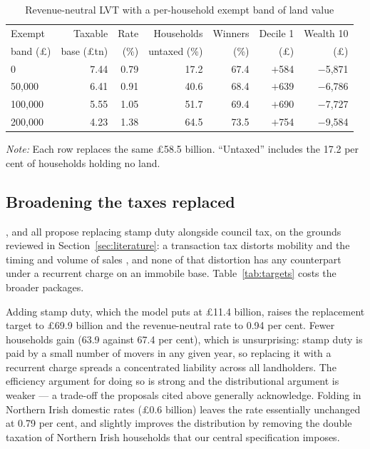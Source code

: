 \begin{table}[htbp]
\centering
\caption{Revenue-neutral LVT with a per-household exempt band of land value}
\label{tab:exempt}
\begin{tabular}{lrrrrrr}
\toprule
Exempt & Taxable & Rate & Households & Winners & Decile 1 & Wealth 10 \\
band (\pounds) & base (\pounds tn) & (\%) & untaxed (\%) & (\%) & (\pounds) & (\pounds) \\
\midrule
0         & 7.44 & 0.79 & 17.2 & 67.4 & $+$584 & $-$5{,}871 \\
50{,}000  & 6.41 & 0.91 & 40.6 & 68.4 & $+$639 & $-$6{,}786 \\
100{,}000 & 5.55 & 1.05 & 51.7 & 69.4 & $+$690 & $-$7{,}727 \\
200{,}000 & 4.23 & 1.38 & 64.5 & 73.5 & $+$754 & $-$9{,}584 \\
\bottomrule
\end{tabular}

\medskip
{\footnotesize\emph{Note:} Each row replaces the same \pounds 58.5 billion. ``Untaxed'' includes the 17.2 per cent of households holding no land.}
\end{table}

\subsection{Broadening the taxes replaced}
\label{sec:broader}

\citet{mirrlees2011}, \citet{muellbauer2005} and \citet{leunig2024} all propose replacing stamp duty alongside council tax, on the grounds reviewed in Section~\ref{sec:literature}: a transaction tax distorts mobility and the timing and volume of sales \citep{best2018, hilber2017}, and none of that distortion has any counterpart under a recurrent charge on an immobile base. Table~\ref{tab:targets} costs the broader packages.

Adding stamp duty, which the model puts at \pounds 11.4 billion, raises the replacement target to \pounds 69.9 billion and the revenue-neutral rate to 0.94 per cent. Fewer households gain (63.9 against 67.4 per cent), which is unsurprising: stamp duty is paid by a small number of movers in any given year, so replacing it with a recurrent charge spreads a concentrated liability across all landholders. The efficiency argument for doing so is strong and the distributional argument is weaker --- a trade-off the proposals cited above generally acknowledge. Folding in Northern Irish domestic rates (\pounds 0.6 billion) leaves the rate essentially unchanged at 0.79 per cent, and slightly improves the distribution by removing the double taxation of Northern Irish households that our central specification imposes.

